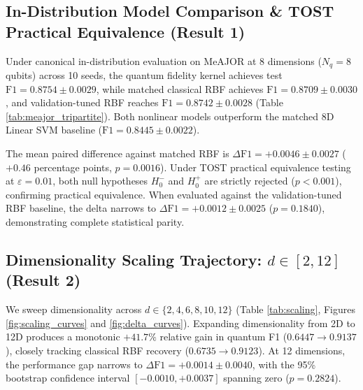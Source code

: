 \documentclass{article}
\begin{document}
\subsection{In-Distribution Model Comparison \& TOST Practical Equivalence (Result 1)}
Under canonical in-distribution evaluation on MeAJOR at 8 dimensions ($N_q = 8$ qubits) across 10 seeds, the quantum fidelity kernel achieves test $\text{F1} = 0.8754 \pm 0.0029$, while matched classical RBF achieves $\text{F1} = 0.8709 \pm 0.0030$, and validation-tuned RBF reaches $\text{F1} = 0.8742 \pm 0.0028$ (Table \ref{tab:meajor_tripartite}). Both nonlinear models outperform the matched 8D Linear SVM baseline ($\text{F1} = 0.8445 \pm 0.0022$).

The mean paired difference against matched RBF is $\Delta\text{F1} = +0.0046 \pm 0.0027$ ($+0.46$ percentage points, $p = 0.0016$). Under TOST practical equivalence testing at $\varepsilon = 0.01$, both null hypotheses $H_0^-$ and $H_0^+$ are strictly rejected ($p < 0.001$), confirming practical equivalence. When evaluated against the validation-tuned RBF baseline, the delta narrows to $\Delta\text{F1} = +0.0012 \pm 0.0025$ ($p = 0.1840$), demonstrating complete statistical parity.

\begin{table}[!htbp]
\centering
\caption{Canonical In-Distribution Model Comparison on MeAJOR (Matched 8D SVD, $N=10$ Seeds).}
\label{tab:meajor_tripartite}
\end{table}

\subsection{Dimensionality Scaling Trajectory: $d \in [2, 12]$ (Result 2)}
We sweep dimensionality across $d \in \{2, 4, 6, 8, 10, 12\}$ (Table \ref{tab:scaling}, Figures \ref{fig:scaling_curves} and \ref{fig:delta_curves}). Expanding dimensionality from 2D to 12D produces a monotonic $+41.7\%$ relative gain in quantum F1 ($0.6447 \to 0.9137$), closely tracking classical RBF recovery ($0.6735 \to 0.9123$). At 12 dimensions, the performance gap narrows to $\Delta\text{F1} = +0.0014 \pm 0.0040$, with the 95\% bootstrap confidence interval $[-0.0010, +0.0037]$ spanning zero ($p = 0.2824$).
\end{document}
